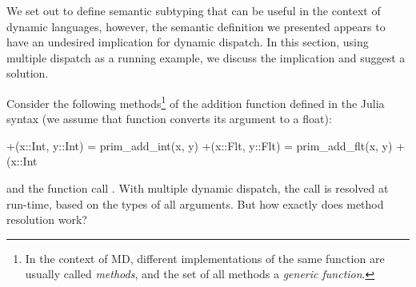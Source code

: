 We set out to define semantic subtyping that can be useful in the context
of dynamic languages, however, 
the semantic definition we presented
appears to have an undesired implication for dynamic dispatch.
In this section, using multiple dispatch as a running example,
we discuss the implication and suggest a solution.

Consider the following methods\footnote{In the context of MD, 
	different implementations of 
	the same function are usually called \emph{methods},
	and the set of all methods a \emph{generic function}.}
of the addition function defined in the Julia syntax
(we assume that function  converts its argument to a float):
\begin{lstminijl}
+(x::Int, y::Int) = prim_add_int(x, y) 
+(x::Flt, y::Flt) = prim_add_flt(x, y) 
+(x::Int%
\end{lstminijl}
and the function call .
With multiple dynamic dispatch, the call is resolved at run-time,
based on the types of all arguments. 
But how exactly does method resolution work?

